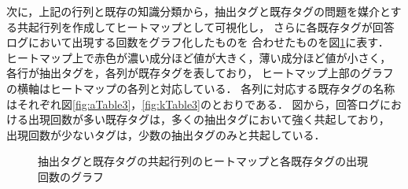 次に，上記の行列と既存の知識分類から，抽出タグと既存タグの問題を媒介とする共起行列を作成してヒートマップとして可視化し，
さらに各既存タグが回答ログにおいて出現する回数をグラフ化したものを
合わせたものを図\ref{fig:Heatmap}に表す．
ヒートマップ上で赤色が濃い成分ほど値が大きく，薄い成分ほど値が小さく，
各行が抽出タグを，各列が既存タグを表しており，
ヒートマップ上部のグラフの横軸はヒートマップの各列と対応している．
各列に対応する既存タグの名称はそれぞれ図\ref{fig:aTable3}，\ref{fig:kTable3}のとおりである．
図から，回答ログにおける出現回数が多い既存タグは，多くの抽出タグにおいて強く共起しており，
出現回数が少ないタグは，少数の抽出タグのみと共起している．

\begin{figure}[H]
\begin{center}
\hspace*{-20pt}
\end{center}
\caption{抽出タグと既存タグの共起行列のヒートマップと各既存タグの出現回数のグラフ}
\label{fig:Heatmap}
\end{figure}


